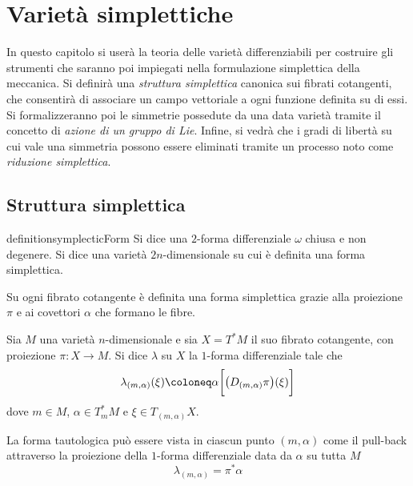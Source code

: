 \chapter{Varietà simplettiche}
In questo capitolo si userà la teoria delle varietà differenziabili per costruire gli strumenti che saranno poi impiegati nella formulazione simplettica della meccanica. Si definirà una \emph{struttura simplettica} canonica sui fibrati cotangenti, che consentirà di associare un campo vettoriale a ogni funzione definita su di essi. Si formalizzeranno poi le simmetrie possedute da una data varietà tramite il concetto di \emph{azione di un gruppo di Lie}. Infine, si vedrà che i gradi di libertà su cui vale una simmetria possono essere eliminati tramite un processo noto come \emph{riduzione simplettica}.

\section{Struttura simplettica}

\begin{restatable}{definition}{symplecticForm}
  Si dice  una $2$-forma differenziale $\omega$ chiusa e non degenere. Si dice  una varietà $2n$-dimensionale su cui è definita una forma simplettica.
\end{restatable}

Su ogni fibrato cotangente è definita una forma simplettica grazie alla proiezione $\pi$ e ai covettori $\alpha$ che formano le fibre.
\begin{definition}
  Sia $M$ una varietà $n$-dimensionale e sia $X = T^*M$ il suo fibrato cotangente, con proiezione $\pi:X\to M$. 
  Si dice  $\lambda$ su $X$ la $1$-forma differenziale tale che \begin{equation}
  \lambda_{(m, \alpha)}(\xi) \defeq \alpha \bigg[\big(D_{(m, \alpha)} \pi\big)(\xi)\bigg]
  \end{equation} 
  dove $m \in M$, $\alpha \in T_m^* M$ e $\xi \in T_{(m,\alpha)}X$.
\end{definition}
\begin{remark}
La forma tautologica può essere vista in ciascun punto $(m,\alpha)$ come il pull-back attraverso la proiezione della $1$-forma differenziale data da $\alpha$ su tutta $M$
\begin{equation}
  \lambda_{(m,\alpha)} = \pi^* \alpha
\end{equation} 
\end{remark}

